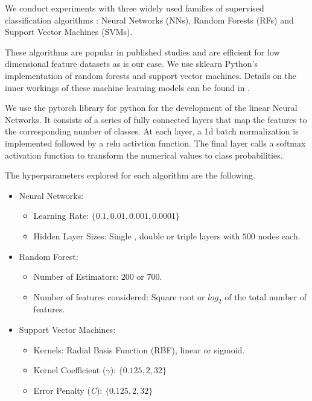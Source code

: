 \documentclass[twocolumn]{aastex62}
\begin{document}
We conduct experiments with three widely used families of supervised classification 
algorithms \citep{skysurvey, 1601.03931}: Neural Networks (NNs),
Random Forests (RFs) and Support Vector Machines (SVMs).  

These algorithms are popular in published studies and are efficient 
for low dimensional feature datasets as is our case. 
We use sklearn \citep{1201.0490} Python's implementation of random
forests and support vector machines.  
Details on the inner workings of these machine learning models can be
found in \cite{9780387848570}. 

We use the pytorch library for python for the development of the
linear Neural Networks. 
It consists of a series of fully connected layers that map the
features to the corresponding number of classes. At each layer, a 1d
batch normalization is implemented followed by a relu activtion
function. The final layer calls a softmax activation function to
transform the numerical values to class probabilities. 

The hyperparameters explored for each algorithm are the
following. 

\begin{itemize}
\item Neural Networks:
\begin{itemize}
\item Learning Rate: $\{0.1,0.01,0.001,0.0001\}$
\item Hidden Layer Sizes: Single , double or triple layers with $500$ nodes each.
\end{itemize}

\item Random Forest:
\begin{itemize}
    \item Number of Estimators: $200$ or $700$.
    \item Number of features considered: Square root or $log_2$ of the
      total number of features. 
\end{itemize}

\item Support Vector Machines:
\begin{itemize}
    \item Kernels: Radial Basis Function (RBF), linear or sigmoid.
    \item Kernel Coefficient ($\gamma$):  
      $\{0.125, 2, 32\}$
    \item Error Penalty (\textit{C}): $\{0.125, 2, 32\}$
\end{itemize}
\end{itemize}
\end{document}
